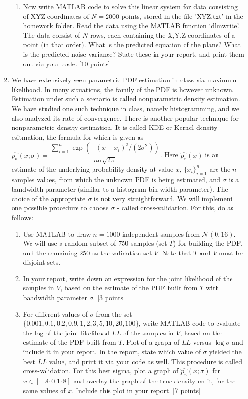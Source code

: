 \documentclass[11pt]{article}
\begin{document}
\begin{enumerate}
\begin{enumerate}
\item Now write MATLAB code to solve this linear system for data consisting of XYZ coordinates of $N = 2000$ points, stored in the file `XYZ.txt' in the homework folder. Read the data using the MATLAB function `dlmwrite'. The data consist of $N$ rows, each containing the X,Y,Z coordinates of a point (in that order). What is the predicted equation of the plane? What is the predicted noise variance? State these in your report, and print them out via your code. \textsf{[10 points]}
\end{enumerate}

\item We have extensively seen parametric PDF estimation in class via maximum likelihood. In many situations, the family of the PDF is however unknown. Estimation under such a scenario is called nonparametric density estimation. We have studied one such technique in class, namely histogramming, and we also analyzed its rate of convergence. There is another popular technique for nonparametric density estimation. It is called KDE or Kernel density esitmation, the formula for which is given as $\hat{p_n}(x;\sigma) = \dfrac{\sum_{i=1}^n \exp{(-(x - x_i)^2/(2 \sigma^2))}}{n \sigma \sqrt{2 \pi}}$. Here $\hat{p_n}(x)$ is an estimate of the underlying probability density at value $x$, $\{x_i\}_{i=1}^n$ are the $n$ samples values, from which the unknown PDF is being estimated, and $\sigma$ is a bandwidth parameter (similar to a histogram bin-width parameter). The choice of the appropriate $\sigma$ is not very straightforward. We will implement one possible procedure to choose $\sigma$ - called cross-validation. For this, do as follows:
\begin{enumerate}
\item Use MATLAB to draw $n = 1000$ independent samples from $\mathcal{N}(0,16)$. We will use a random subset of 750 samples (set $T$) for building the PDF, and the remaining 250 as the validation set $V$. Note that $T$ and $V$ must be disjoint sets. 
\item In your report, write down an expression for the joint likelihood of the samples in $V$, based on the estimate of the PDF built from $T$ with bandwidth parameter $\sigma$. \textsf{[3 points]}
\item For different values of $\sigma$ from the set $\{0.001, 0.1, 0.2, 0.9, 1, 2, 3, 5, 10, 20, 100\}$, write MATLAB code to evaluate the log of the joint likelihood $LL$ of the samples in $V$, based on the estimate of the PDF built from $T$. Plot of a graph of $LL$ versus $\log \sigma$ and include it in your report. In the report, state which value of $\sigma$ yielded the best $LL$ value, and print it via your code as well.  This procedure is called cross-validation. For this best sigma, plot a graph of $\hat{p_n}(x;\sigma)$ for $x \in [-8:0.1:8]$ and overlay the graph of the true density on it, for the same values of $x$. Include this plot in your report. \textsf{[7 points]}

\end{enumerate}
\end{enumerate}
\end{document}
